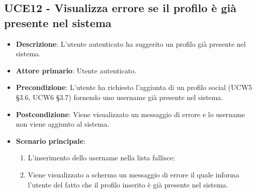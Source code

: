 \subsection{UCE12 - Visualizza errore se il profilo è già presente nel sistema}
\begin{itemize}
	\item \textbf{Descrizione}: L'utente autenticato ha suggerito un profilo già presente nel sistema.
    \item \textbf{Attore primario}: Utente autenticato.
    \item \textbf{Precondizione}: L’utente ha richiesto l’aggiunta di un profilo social (UCW5 §3.6, UCW6 §3.7) fornendo uno username già presente nel sistema.
    \item \textbf{Postcondizione}: Viene visualizzato un messaggio di errore e lo username non viene aggiunto al sistema.
    \item \textbf{Scenario principale}: 
    \begin{enumerate}
        \item L'inserimento dello username nella lista fallisce;
        \item Viene visualizzato a schermo un messaggio di errore il quale informa l'utente del fatto che il profilo inserito è già presente nel sistema.
    \end{enumerate}
\end{itemize}
